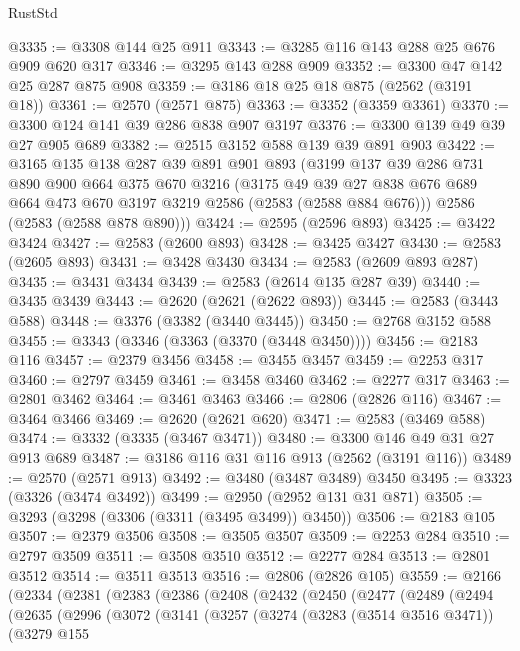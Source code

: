 \begin{lexlean}{RustStd}
\begin{coremodule}
@3335 := @3308 @144 @25 @911
@3343 := @3285 @116 @143 @288 @25 @676 @909 @620 @317
@3346 := @3295 @143 @288 @909
@3352 := @3300 @47 @142 @25 @287 @875 @908
@3359 := @3186 @18 @25 @18 @875 (@2562 (@3191 @18))
@3361 := @2570 (@2571 @875)
@3363 := @3352 (@3359 @3361)
@3370 := @3300 @124 @141 @39 @286 @838 @907 @3197
@3376 := @3300 @139 @49 @39 @27 @905 @689
@3382 := @2515 @3152 @588 @139 @39 @891 @903
@3422 := @3165
    @135
    @138
    @287
    @39
    @891
    @901
    @893
    (@3199
      @137
      @39
      @286
      @731
      @890
      @900
      @664
      @375
      @670
      @3216
      (@3175 @49 @39 @27 @838 @676 @689 @664 @473 @670 @3197 @3219 @2586 (@2583 (@2588 @884 @676)))
      @2586
      (@2583 (@2588 @878 @890)))
@3424 := @2595 (@2596 @893)
@3425 := @3422 @3424
@3427 := @2583 (@2600 @893)
@3428 := @3425 @3427
@3430 := @2583 (@2605 @893)
@3431 := @3428 @3430
@3434 := @2583 (@2609 @893 @287)
@3435 := @3431 @3434
@3439 := @2583 (@2614 @135 @287 @39)
@3440 := @3435 @3439
@3443 := @2620 (@2621 (@2622 @893))
@3445 := @2583 (@3443 @588)
@3448 := @3376 (@3382 (@3440 @3445))
@3450 := @2768 @3152 @588
@3455 := @3343 (@3346 (@3363 (@3370 (@3448 @3450))))
@3456 := @2183 @116
@3457 := @2379 @3456
@3458 := @3455 @3457
@3459 := @2253 @317
@3460 := @2797 @3459
@3461 := @3458 @3460
@3462 := @2277 @317
@3463 := @2801 @3462
@3464 := @3461 @3463
@3466 := @2806 (@2826 @116)
@3467 := @3464 @3466
@3469 := @2620 (@2621 @620)
@3471 := @2583 (@3469 @588)
@3474 := @3332 (@3335 (@3467 @3471))
@3480 := @3300 @146 @49 @31 @27 @913 @689
@3487 := @3186 @116 @31 @116 @913 (@2562 (@3191 @116))
@3489 := @2570 (@2571 @913)
@3492 := @3480 (@3487 @3489) @3450
@3495 := @3323 (@3326 (@3474 @3492))
@3499 := @2950 (@2952 @131 @31 @871)
@3505 := @3293 (@3298 (@3306 (@3311 (@3495 @3499)) @3450))
@3506 := @2183 @105
@3507 := @2379 @3506
@3508 := @3505 @3507
@3509 := @2253 @284
@3510 := @2797 @3509
@3511 := @3508 @3510
@3512 := @2277 @284
@3513 := @2801 @3512
@3514 := @3511 @3513
@3516 := @2806 (@2826 @105)
@3559 := @2166
    (@2334
      (@2381
        (@2383
          (@2386
            (@2408
              (@2432
                (@2450
                  (@2477
                    (@2489
                      (@2494
                        (@2635
                          (@2996
                            (@3072
                              (@3141
                                (@3257
                                  (@3274
                                    (@3283 (@3514 @3516 @3471))
                                    (@3279
                                      @155

\end{coremodule}
\end{lexlean}
